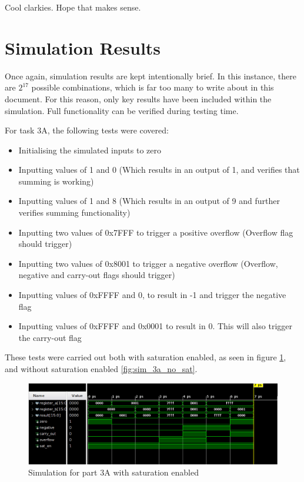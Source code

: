 \documentclass[12pt,a4paper]{article}
\begin{document}
Cool clarkies. Hope that makes sense.

\section{Simulation Results}

Once again, simulation results are kept intentionally brief. In this instance, there are $2^{17}$ possible combinations, which is far too many to write about in this document. For this reason, only key results have been included within the simulation. Full functionality can be verified during testing time.

For task 3A, the following tests were covered:

\begin{itemize}
    \item Initialising the simulated inputs to zero
    \item Inputting values of 1 and 0 (Which results in an output of 1, and verifies that summing is working)
    \item Inputting values of 1 and 8 (Which results in an output of 9 and further verifies summing functionality)
    \item Inputting two values of 0x7FFF to trigger a positive overflow (Overflow flag should trigger)
    \item Inputting two values of 0x8001 to trigger a negative overflow (Overflow, negative and carry-out flags should trigger)
    \item Inputting values of 0xFFFF and 0, to result in -1 and trigger the negative flag
    \item Inputting values of 0xFFFF and 0x0001 to result in 0. This will also trigger the carry-out flag
\end{itemize}

These tests were carried out both with saturation enabled, as seen in figure \ref{fig:sim_3a_sat_en}, and without saturation enabled \ref{fig:sim_3a_no_sat}.

\begin{figure}[H]
    \centering
    \includegraphics[scale=0.25]{images/sim_3a_sat_en.png}
    \caption{Simulation for part 3A with saturation enabled}
    \label{fig:sim_3a_sat_en}
\end{figure}
\end{document}
